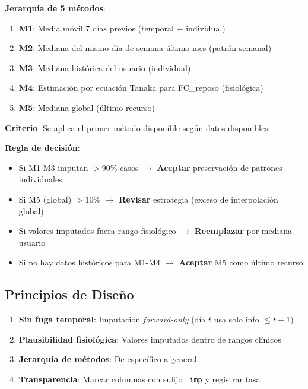 \documentclass[12pt,letterpaper,twoside]{report}
\begin{document}
\begin{estadisticobox}
\textbf{Jerarquía de 5 métodos}:

\begin{enumerate}[noitemsep]
    \item \textbf{M1}: Media móvil 7 días previos (temporal + individual)
    \item \textbf{M2}: Mediana del mismo día de semana último mes (patrón semanal)
    \item \textbf{M3}: Mediana histórica del usuario (individual)
    \item \textbf{M4}: Estimación por ecuación Tanaka para FC\_reposo (fisiológica)
    \item \textbf{M5}: Mediana global (último recurso)
\end{enumerate}

\textbf{Criterio}: Se aplica el primer método disponible según datos disponibles.
\end{estadisticobox}

\begin{reglabox}
\textbf{Regla de decisión}:

\begin{itemize}[noitemsep]
    \item Si M1-M3 imputan $> 90\%$ casos $\to$ \textbf{Aceptar} preservación de patrones individuales
    \item Si M5 (global) $> 10\%$ $\to$ \textbf{Revisar} estrategia (exceso de interpolación global)
    \item Si valores imputados fuera rango fisiológico $\to$ \textbf{Reemplazar} por mediana usuario
    \item Si no hay datos históricos para M1-M4 $\to$ \textbf{Aceptar} M5 como último recurso
\end{itemize}
\end{reglabox}

\subsection{Principios de Diseño}

\begin{enumerate}[noitemsep]
    \item \textbf{Sin fuga temporal}: Imputación \textit{forward-only} (día $t$ usa solo info $\leq t-1$)
    \item \textbf{Plausibilidad fisiológica}: Valores imputados dentro de rangos clínicos
    \item \textbf{Jerarquía de métodos}: De específico a general
    \item \textbf{Transparencia}: Marcar columnas con sufijo \texttt{\_imp} y registrar tasa
\end{enumerate}
\end{document}
